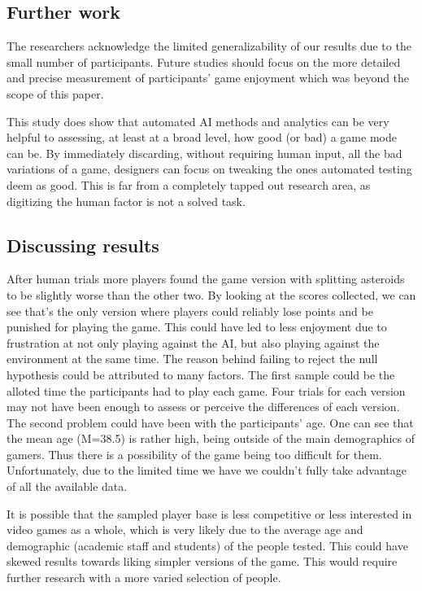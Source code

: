 \subsection{Further work}

The researchers acknowledge the limited generalizability of our results due to the small number of participants. Future studies should focus on the more detailed and precise measurement of participants’ game enjoyment which was beyond the scope of this paper.

This study does show that automated AI methods and analytics can be very helpful to assessing, at least at a broad level, how good (or bad) a game mode can be. By immediately discarding, without requiring human input, all the bad variations of a game, designers can focus on tweaking the ones automated testing deem as good. This is far from a completely tapped out research area, as digitizing the human factor is not a solved task.

\subsection{Discussing results}

After human trials more players found the game version with splitting asteroids to be slightly worse than the other two. By looking at the scores collected, we can see that's the only version where players could reliably lose points and be punished for playing the game. This could have led to less enjoyment due to frustration at not only playing against the AI, but also playing against the environment at the same time. The reason behind failing to reject the null hypothesis could be attributed to many factors. The first sample could be the alloted time the participants had to play each game. Four trials for each version may not have been enough to assess or perceive the differences of each version. The second problem could have been with the participants' age. One can see that the mean age (M=38.5) is rather high, being outside of the main demographics of gamers. Thus there is a possibility of the game being too difficult for them. Unfortunately, due to the limited time we have we couldn't fully take advantage of all the available data.

It is possible that the sampled player base is less competitive or less interested in video games as a whole, which is very likely due to the average age and demographic (academic staff and students) of the people tested. This could have skewed results towards liking simpler versions of the game. This would require further research with a more varied selection of people.

